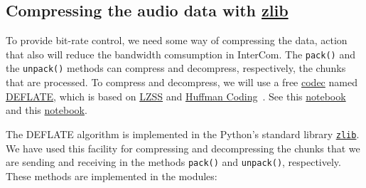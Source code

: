 \subsection{Compressing the audio data with \href{https://zlib.net/}{zlib}}
To provide bit-rate control, we need some way of compressing the data, action that also  will reduce the bandwidth comsumption in InterCom. The
\verb|pack()| and the \verb|unpack()| methods can compress and
decompress, respectively, the chunks that are processed. To compress
and decompress, we will use a free
\href{https://en.wikipedia.org/wiki/Codec}{codec} named
\href{https://en.wikipedia.org/wiki/DEFLATE}{DEFLATE}, which is based
on
\href{https://en.wikipedia.org/wiki/Lempel%E2%80%93Ziv%E2%80%93Storer%E2%80%93Szymanski}{LZSS}
  and \href{https://en.wikipedia.org/wiki/Huffman_coding}{Huffman
    Coding}~\cite{nelson96datacompression}. See this
  \href{https://github.com/vicente-gonzalez-ruiz/LZ77}{notebook} and
  this
  \href{https://vicente-gonzalez-ruiz.github.io/Huffman_coding/}{notebook}.

The DEFLATE algorithm is implemented in the Python's standard library
\href{https://docs.python.org/3/library/zlib.html}{\texttt{zlib}}. We
have used this facility for compressing and decompressing the chunks
that we are sending and receiving in the methods \verb|pack()| and
\verb|unpack()|, respectively. These methods are implemented in the
modules:

